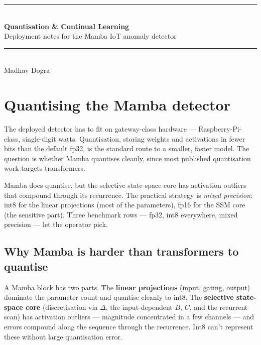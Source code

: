 \documentclass[11pt,a4paper]{article}
\begin{document}
\begin{center}
{\color{primary}\rule{\linewidth}{1pt}}\\[6pt]
{\Huge\bfseries\color{ink} Quantisation \& Continual Learning} \\[6pt]
{\Large\color{secondary} Deployment notes for the Mamba IoT anomaly detector} \\[4pt]
{\color{mute}\rule{0.6\linewidth}{0.3pt}}\\[4pt]
{\normalsize\color{mute} Madhav Dogra}
\end{center}

\vspace{4pt}

\section{Quantising the Mamba detector}

The deployed detector has to fit on gateway-class hardware --- Raspberry-Pi-class, single-digit watts. Quantisation, storing weights and activations in fewer bits than the default fp32, is the standard route to a smaller, faster model. The question is whether Mamba quantises cleanly, since most published quantisation work targets transformers.

\begin{tcolorbox}[idea]
Mamba does quantise, but the selective state-space core has activation outliers that compound through its recurrence. The practical strategy is \emph{mixed precision}: int8 for the linear projections (most of the parameters), fp16 for the SSM core (the sensitive part). Three benchmark rows --- fp32, int8 everywhere, mixed precision --- let the operator pick.
\end{tcolorbox}

\subsection{Why Mamba is harder than transformers to quantise}

A Mamba block has two parts. The \textbf{linear projections} (input, gating, output) dominate the parameter count and quantise cleanly to int8. The \textbf{selective state-space core} (discretisation via $\Delta$, the input-dependent $B$, $C$, and the recurrent scan) has activation outliers --- magnitude concentrated in a few channels --- and errors compound along the sequence through the recurrence. Int8 can't represent these without large quantisation error.
\end{document}
